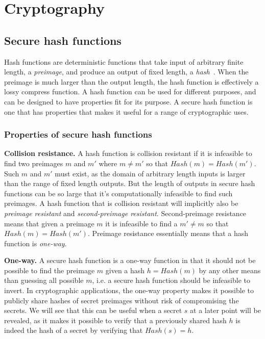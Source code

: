 \section{Cryptography}
\label{sec:cryptography}

\subsection{Secure hash functions}

Hash functions are deterministic functions that take input of arbitrary finite length, a \emph{preimage}, and produce an output of fixed length, a \emph{hash}~\cite[p.~153]{lindell2014introduction}. When the preimage is much larger than the output length, the hash function is effectively a lossy compress function. A hash function can be used for different purposes, and can be designed to have properties fit for its purpose. A secure hash function is one that has properties that makes it useful for a range of cryptographic uses. 

\subsubsection{Properties of secure hash functions}

\noindent
{\bf Collision resistance.}
A hash function is collision resistant if it is infeasible to find two preimages $m$ and $m'$ where $m \neq m'$ so that $Hash(m) = Hash(m')$. Such $m$ and $m'$ must exist, as the domain of arbitrary length inputs is larger than the range of fixed length outputs. But the length of outputs in secure hash functions can be so large that it's computationally infeasible to find such preimages. 
A hash function that is collision resistant will implicitly also be \emph{preimage resistant} and \emph{second-preimage resistant}. Second-preimage resistance means that given a preimage $m$ it is infeasible to find a $m' \neq m$ so that $Hash(m) = Hash(m')$. Preimage resistance essentially means that a hash function is \emph{one-way}.

\noindent
{\bf One-way.}
A secure hash function is a one-way function in that it should not be possible to find the preimage $m$ given a hash $h = Hash(m)$ by any other means than guessing all possible $m$, i.e. a secure hash function should be infeasible to invert. In cryptographic applications, the one-way property makes it possible to publicly share hashes of secret preimages without risk of compromising the secrets. We will see that this can be useful when a secret $s$ at a later point will be revealed, as it makes it possible to verify that a previously shared hash $h$ is indeed the hash of a secret by verifying that $Hash(s) = h$.

